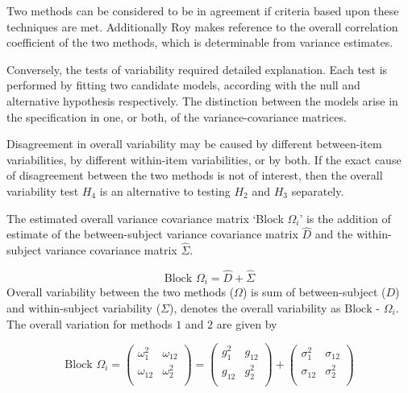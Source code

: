 \documentclass[12pt, a4paper]{report}
\theoremstyle{plain}
\theoremstyle{definition}
\theoremstyle{remark}
\begin{document}
	Two methods can be considered to be in agreement if criteria based upon these techniques are met. Additionally Roy makes reference to the overall correlation coefficient of the two methods, which is determinable from variance estimates.
	
	Conversely, the tests of variability required detailed explanation. Each test is performed by fitting two candidate models, according with the null and alternative hypothesis respectively. The distinction between the models arise in the specification in one, or both, of the variance-covariance matrices. %
	
	
	
	Disagreement in overall variability may be caused by different between-item variabilities, by different within-item variabilities, or by both.  If the exact cause of disagreement between the two methods is not of interest, then the overall variability test $H_4$ is an alternative to testing $H_2$ and $H_3$ separately.
	
	The estimated overall variance covariance matrix `Block
	$\Omega_{i}$' is the addition of estimate of the between-subject variance covariance matrix $\hat{D}$ and the within-subject variance covariance matrix $\hat{\Sigma}$.
	
	\begin{equation}
	\mbox{Block  }\Omega_{i} = \hat{D} + \hat{\Sigma}
	\end{equation}
	Overall variability between the two methods ($\Omega$) is sum of between-subject ($D$) and within-subject variability ($\Sigma$),
	\citet{ARoy2009} denotes the overall variability	as ${\mbox{Block - } \Omega_{i}}$. The overall variation for methods $1$ and $2$ are given by
	
	\begin{center}
		\[\mbox{Block } {\Omega}_i = \left(\begin{array}{cc}
		\omega^2_1  & \omega_{12} \\
		\omega_{12} & \omega^2_2 \\
		\end{array}  \right)
		=  \left(
		\begin{array}{cc}
		g^2_1  & g_{12} \\
		g_{12} & g^2_2 \\
		\end{array} \right)+
		\left(
		\begin{array}{cc}
		\sigma^2_1  & \sigma_{12} \\
		\sigma_{12} & \sigma^2_2 \\
		\end{array}\right)
		\]
	\end{center}
	
\end{document}
